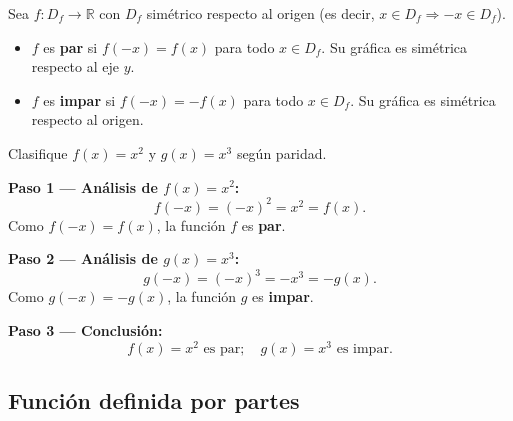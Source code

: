 \begin{definition}
Sea $f: D_f \to \mathbb{R}$ con $D_f$ simétrico respecto al origen (es decir, $x \in D_f \Rightarrow -x \in D_f$).
\begin{itemize}
  \item $f$ es \textbf{par} si $f(-x) = f(x)$ para todo $x \in D_f$. Su gráfica es simétrica respecto al eje $y$.
  \item $f$ es \textbf{impar} si $f(-x) = -f(x)$ para todo $x \in D_f$. Su gráfica es simétrica respecto al origen.
\end{itemize}
\end{definition}

\begin{example}
Clasifique $f(x) = x^2$ y $g(x) = x^3$ según paridad.

\begin{myproof}
\textbf{Paso 1 — Análisis de $f(x)=x^2$:}
\[
  f(-x) = (-x)^2 = x^2 = f(x).
\]
Como $f(-x)=f(x)$, la función $f$ es \textbf{par}.

\textbf{Paso 2 — Análisis de $g(x)=x^3$:}
\[
  g(-x) = (-x)^3 = -x^3 = -g(x).
\]
Como $g(-x)=-g(x)$, la función $g$ es \textbf{impar}.

\textbf{Paso 3 — Conclusión:}
\[
  \boxed{f(x)=x^2 \text{ es par}; \quad g(x)=x^3 \text{ es impar.}}
\]
\end{myproof}
\end{example}



\subsection{Función definida por partes}


